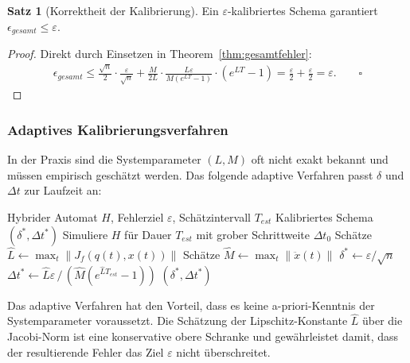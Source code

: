 ﻿\documentclass[a4paper,12pt]{article}
\theoremstyle{definition}
\newtheorem{satz}{Satz}[section]
\begin{document}
\begin{satz}[Korrektheit der Kalibrierung]
Ein $\varepsilon$-kalibriertes Schema garantiert $\epsilon_{\mathit{gesamt}} \leq \varepsilon$.
\end{satz}

\begin{proof}
Direkt durch Einsetzen in Theorem~\ref{thm:gesamtfehler}:
\begin{align}
  \epsilon_{\mathit{gesamt}} \leq \frac{\sqrt{n}}{2} \cdot \frac{\varepsilon}{\sqrt{n}} + \frac{M}{2L} \cdot \frac{L\varepsilon}{M(e^{LT}-1)} \cdot (e^{LT}-1) = \frac{\varepsilon}{2} + \frac{\varepsilon}{2} = \varepsilon. \qquad \square
\end{align}
\end{proof}

\subsubsection{Adaptives Kalibrierungsverfahren}

In der Praxis sind die Systemparameter $(L, M)$ oft nicht exakt bekannt und müssen empirisch geschätzt werden. Das folgende adaptive Verfahren passt $\delta$ und $\Delta t$ zur Laufzeit an:

\begin{algorithm}[H]
  \caption{Adaptives Kalibrierungsverfahren}
  \begin{algorithmic}[1]
    \Eingabe Hybrider Automat $H$, Fehlerziel $\varepsilon$, Schätzintervall $T_{\mathit{est}}$
    \Ausgabe Kalibriertes Schema $(\delta^*, \Delta t^*)$
      \State Simuliere $H$ für Dauer $T_{\mathit{est}}$ mit grober Schrittweite $\Delta t_0$
      \State Schätze $\hat{L} \gets \max_{t} \|J_f(q(t), x(t))\|$ 
      \State Schätze $\hat{M} \gets \max_{t} \|\ddot{x}(t)\|$ 
      \State $\delta^* \gets \varepsilon / \sqrt{n}$
      \State $\Delta t^* \gets \hat{L}\varepsilon \,/\, (\hat{M}(e^{\hat{L}T_{\mathit{est}}}-1))$
      \State \Return $(\delta^*, \Delta t^*)$
    \EndProzedur
  \end{algorithmic}
\end{algorithm}

Das adaptive Verfahren hat den Vorteil, dass es keine a-priori-Kenntnis der Systemparameter voraussetzt. Die Schätzung der Lipschitz-Konstante $\hat{L}$ über die Jacobi-Norm ist eine konservative obere Schranke und gewährleistet damit, dass der resultierende Fehler das Ziel $\varepsilon$ nicht überschreitet.
\end{document}
